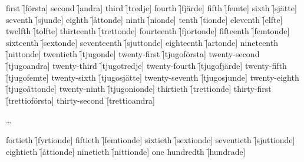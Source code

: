 \begin{questions}
    \begin{multicols}{2}
        \raggedcolumns
        \question first \f[första]
        \question second \f[andra]
        \question third \f[tredje]
        \question fourth \f[fjärde]
        \question fifth \f[femte]
        \question sixth \f[sjätte]
        \question seventh \f[sjunde]
        \question eighth \f[åttonde]
        \question ninth \f[nionde]
        \question tenth \f[tionde]
        \question eleventh \f[elfte]
        \question twelfth \f[tolfte]
        \question thirteenth \f[trettonde]
        \question fourteenth \f[fjortonde]
        \question fifteenth \f[femtonde]
        \question sixteenth \f[sextonde]
        \question seventeenth \f[sjuttonde]
        \question eighteenth \f[artonde]
        \question nineteenth \f[nittonde]
        \question twentieth \f[tjugonde]
        \question twenty-first \f[tjugoförsta]
        \question twenty-second \f[tjugoandra]
        \question twenty-third \f[tjugotredje]
        \question twenty-fourth \f[tjugofjärde]
        \question twenty-fifth \f[tjugofemte]
        \question twenty-sixth \f[tjugosjätte]
        \question twenty-seventh \f[tjugosjunde]
        \question twenty-eighth \f[tjugoåttonde]
        \question twenty-ninth \f[tjugonionde]
        \question thirtieth \f[trettionde]
        \question thirty-first \f[trettioförsta]
        \question thirty-second \f[trettioandra]

        \ldots

        \question fortieth \f[fyrtionde]
        \question fiftieth \f[femtionde]
        \question sixtieth \f[sextionde]
        \question seventieth \f[sjuttionde]
        \question eightieth \f[åttionde]
        \question ninetieth \f[nittionde]
        \question one hundredth \f[hundrade]
    \end{multicols}
\end{questions}
